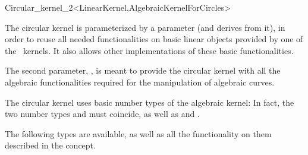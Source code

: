 \begin{ccRefClass}{Circular_kernel_2<LinearKernel,AlgebraicKernelForCircles>}


\ccIsModel


\ccParameters

The circular kernel is parameterized by a  parameter
(and derives from it), in order to reuse all needed functionalities on
basic linear objects provided by one of the \cgal\ kernels. It also
allows other implementations of these basic functionalities.

The second parameter, , is meant to provide the
circular kernel with all the algebraic functionalities required for the
manipulation of algebraic curves. 

\ccInheritsFrom


\ccTypes

\ccThreeToTwo

The circular kernel uses basic number types of the algebraic kernel:
In fact, the two number types  and
 must coincide, as well as
 and .

The following types are available, as well as all the functionality on
them described in the  concept. 

\ccGlue
{}
\ccGlue
{}

\ccSeeAlso

\\
\\

\end{ccRefClass}
